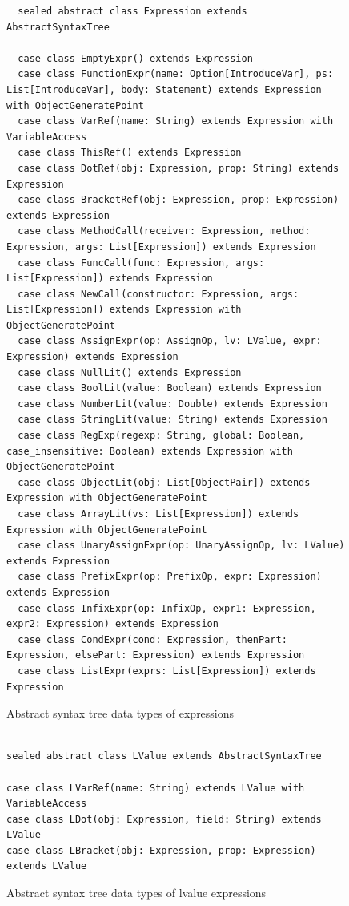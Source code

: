 \documentclass[12pt]{report}
\begin{document}
\begin{figure}
\small
{}
\begin{lstlisting}
  sealed abstract class Expression extends AbstractSyntaxTree

  case class EmptyExpr() extends Expression
  case class FunctionExpr(name: Option[IntroduceVar], ps: List[IntroduceVar], body: Statement) extends Expression with ObjectGeneratePoint
  case class VarRef(name: String) extends Expression with VariableAccess
  case class ThisRef() extends Expression
  case class DotRef(obj: Expression, prop: String) extends Expression
  case class BracketRef(obj: Expression, prop: Expression) extends Expression
  case class MethodCall(receiver: Expression, method: Expression, args: List[Expression]) extends Expression
  case class FuncCall(func: Expression, args: List[Expression]) extends Expression
  case class NewCall(constructor: Expression, args: List[Expression]) extends Expression with ObjectGeneratePoint
  case class AssignExpr(op: AssignOp, lv: LValue, expr: Expression) extends Expression
  case class NullLit() extends Expression
  case class BoolLit(value: Boolean) extends Expression
  case class NumberLit(value: Double) extends Expression
  case class StringLit(value: String) extends Expression
  case class RegExp(regexp: String, global: Boolean, case_insensitive: Boolean) extends Expression with ObjectGeneratePoint
  case class ObjectLit(obj: List[ObjectPair]) extends Expression with ObjectGeneratePoint
  case class ArrayLit(vs: List[Expression]) extends Expression with ObjectGeneratePoint
  case class UnaryAssignExpr(op: UnaryAssignOp, lv: LValue) extends Expression
  case class PrefixExpr(op: PrefixOp, expr: Expression) extends Expression
  case class InfixExpr(op: InfixOp, expr1: Expression, expr2: Expression) extends Expression
  case class CondExpr(cond: Expression, thenPart: Expression, elsePart: Expression) extends Expression
  case class ListExpr(exprs: List[Expression]) extends Expression
\end{lstlisting}
\caption{Abstract syntax tree data types of expressions}
\label{fig:js-expr}
\end{figure}

\begin{figure}
\small
{}
\begin{lstlisting}

sealed abstract class LValue extends AbstractSyntaxTree

case class LVarRef(name: String) extends LValue with VariableAccess
case class LDot(obj: Expression, field: String) extends LValue
case class LBracket(obj: Expression, prop: Expression) extends LValue
\end{lstlisting}
\caption{Abstract syntax tree data types of lvalue expressions}
\label{fig:js-lvalue}
\end{figure}
\end{document}
